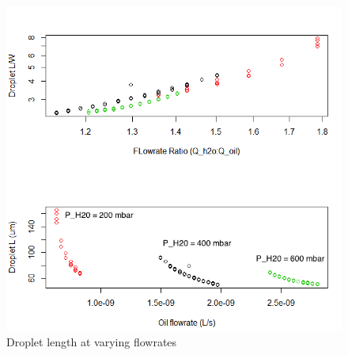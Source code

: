 \begin{figure}[h]
\centering 
\includegraphics[width=0.750\columnwidth]{constP.PNG} 
\caption[Regime Change at varying flows]{Droplet length at varying flowrates} 
\label{fig:constP} 
\end{figure}



